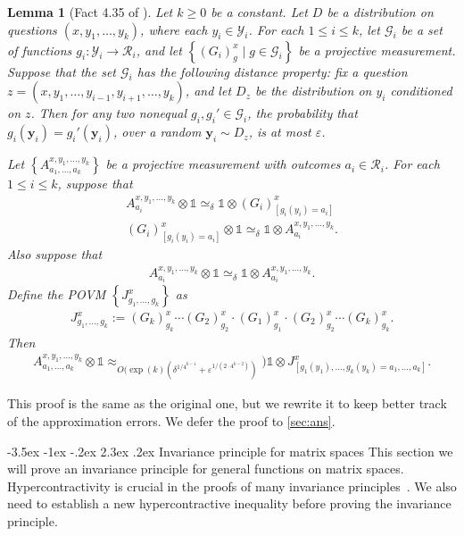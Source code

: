 \documentclass[11pt]{article}
\makeatletter
\renewcommand{\section}{\@startsection {section}{1}{\z@}%
             {-3.5ex \@plus -1ex \@minus -.2ex}%
             {2.3ex \@plus .2ex}%
             {\normalfont\Large\scshape\bfseries}}
\theoremstyle{plain}
\newtheorem{lemma}[theorem]{Lemma}
\theoremstyle{definition}
\newcommand {\set} [1] {\ensuremath{ \left\lbrace #1 \right\rbrace }}
\newcommand {\id} {\ensuremath{\mathds{1}}}
\newcommand{\ep} {\ensuremath{\varepsilon}}
\newcommand{\x}{\otimes}
\newcommand{\calY}{\mathcal{Y}}
\newcommand{\calG}{\mathcal{G}}
\newcommand{\calR}{\mathcal{R}}
\newcommand{\appd}[1]{\approx_{#1}}
\newcommand{\1}{\mathbb{1}} %
\newcommand{\by}{\pmb{y}}
\makeatother
\begin{document}
\begin{lemma}[Fact 4.35 of \cite{neexp}]
	\label{lm:k_prod_distr}
	Let $k \geq 0$ be a constant.
	Let $D$ be a distribution on questions $(x, y_1, \ldots, y_k)$, where
	each $y_i \in \calY_i$. For each $1 \leq i \leq k$, let $\calG_i$ be a set of functions $g_i : \calY_i \to \calR_i$,
	and let $\set{ (G_i)^x_g \mid g \in \calG_i}$ be a projective measurement.
	Suppose that the set $\calG_i$ has the following distance property: fix a question
	$z = (x, y_1,\ldots, y_{i-1}, y_{i+1},\ldots, y_k)$, and let $D_z$ be the distribution on $y_i$ conditioned on $z$.
	Then for any two nonequal $g_i, g_i' \in \calG_i$, the probability that $g_i(\by_i) = g_i'(\by_i)$, over a random 
	$\by_i \sim D_z$, is at most $\ep$.
	
	Let $\set{ A^{x,y_1,\ldots, y_k}_{a_1,\ldots, a_k}}$ be a projective measurement with outcomes $a_i \in \calR_i$.
	For each $1 \leq i \leq k$, suppose that 
	\begin{align}
		\label{eq:A_G_consist}
		A^{x,y_1, \ldots, y_k}_{a_i} \x \id \simeq_{\delta} \id \x (G_i)^x_{[g_i(y_i)=a_i]}  \\
		\label{eq:G_A_consist}
		(G_i)^x_{[g_i(y_i)=a_i]} \x \id \simeq_{\delta} \id \x A^{x,y_1, \ldots, y_k}_{a_i}.
	\end{align}
	Also suppose that 
	\begin{align}
		\label{eq:A_consist}
		A^{x,y_1, \ldots, y_k}_{a_i} \x \id \simeq_{\delta} \id \x A^{x,y_1, \ldots, y_k}_{a_i}. 
	\end{align}
	Define the POVM $\set{ J^x_{g_1, \ldots, g_k} }$ as
	\begin{align*}
		J^x_{g_1, \ldots, g_k}:= (G_k)^x_{g_k} \cdots (G_2)^x_{g_2} \cdot (G_1)^x_{g_1} \cdot (G_2)^x_{g_2}
		\cdots (G_k)^x_{g_k}.
	\end{align*}
	Then
	\begin{align*}
		A^{x,y_1, \ldots, y_k}_{a_1,\ldots, a_k} \x \id \appd{O(\exp(k) (\delta^{1/4^{k-1}} + \ep^{1/(2\cdot 4^{k-2})})}) \id \x J^x_{[g_1(y_1),\ldots, g_k(y_k) = a_1, \ldots, a_k]}.
	\end{align*}
\end{lemma}
This proof is the same as the original one, but we rewrite it to keep better track of the approximation errors.
We defer the proof to \cref{sec:ans}.


%
\section{Invariance principle for matrix spaces}\label{sec:invariance}
This section we will prove an invariance principle for general functions on matrix spaces. Hypercontractivity is crucial in the proofs of many invariance principles~\cite{mossel2005noise,isaksson2012maximally,10.1145/2395116.2395118,qin2021nonlocal,10.1145/3519935.3519965}. We also need to establish a new hypercontractive inequality before proving the invariance principle.
\end{document}
